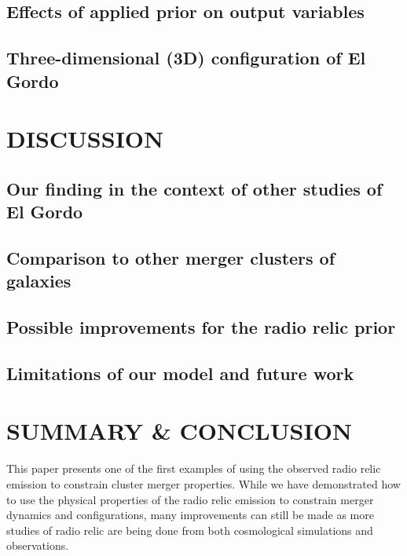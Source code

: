 \subsection{Effects of applied prior on output variables}




\subsection{Three-dimensional (3D) configuration of El Gordo}


\section{DISCUSSION}
\subsection{Our finding in the context of other studies of El Gordo}


\subsection{Comparison to other merger clusters of galaxies}


\subsection{Possible improvements for the radio relic prior}


\subsection{Limitations of our model and future work} 



\section{SUMMARY \& CONCLUSION}
This paper presents one of the first examples of using the observed radio
relic emission to constrain cluster merger properties.
While we have demonstrated how to use the physical properties of the radio
relic emission to constrain merger dynamics and configurations, many
improvements can still be made as more studies of radio relic are being
done from both cosmological simulations and observations.

